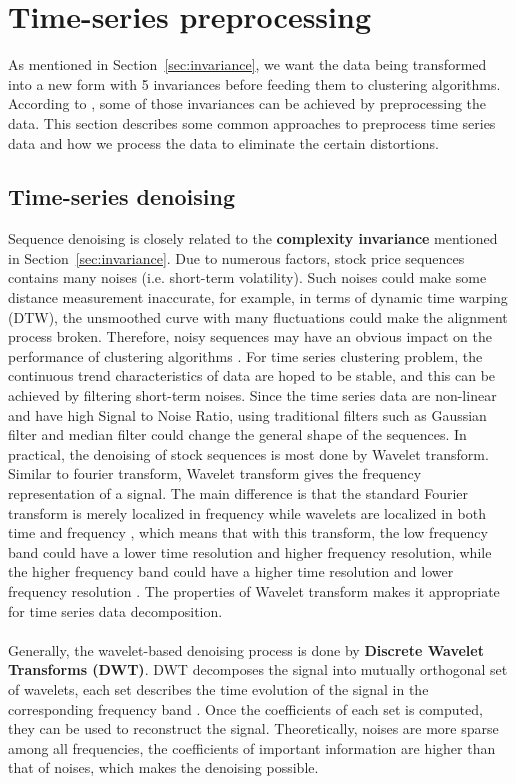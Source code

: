 \section{Time-series preprocessing}
As mentioned in Section~\ref{sec:invariance}, we want the data being transformed into a new form with 5 invariances before feeding them to clustering algorithms. According to \cite{paparrizos2015k}, some of those invariances can be achieved by preprocessing the data. This section describes some common approaches to preprocess time series data and how we process the data to eliminate the certain distortions.

\subsection{Time-series denoising}
\label{sec:denosing}
Sequence denoising is closely related to the \textbf{complexity invariance} mentioned in Section~\ref{sec:invariance}. Due to numerous factors, stock price sequences contains many noises (i.e. short-term volatility). Such noises could make some distance measurement inaccurate, for example, in terms of dynamic time warping (DTW), the unsmoothed curve with many fluctuations could make the alignment process broken. Therefore, noisy sequences may have an obvious impact on the performance of clustering algorithms \cite{zhang2011novel}. For time series clustering problem, the continuous trend characteristics of data are hoped to be stable, and this can be achieved by filtering short-term noises. Since the time series data are non-linear and have high Signal to Noise Ratio, using traditional filters such as Gaussian filter and median filter could change the general shape of the sequences. In practical, the denoising of stock sequences is most done by Wavelet transform. Similar to fourier transform, Wavelet transform gives the frequency representation of a signal. The main difference is that the standard Fourier transform is merely localized in frequency while wavelets are localized in both time and frequency \cite{shensa1992discrete}, which means that with this transform, the low frequency band could have a lower time resolution and higher frequency resolution, while the higher frequency band could have a higher time resolution and lower frequency resolution \cite{wu2021hybrid}. The properties of Wavelet transform makes it appropriate for time series data decomposition.\\
\\Generally, the wavelet-based denoising process is done by \textbf{Discrete Wavelet Transforms (DWT)}. DWT  decomposes the signal into mutually orthogonal set of wavelets, each set describes the time evolution of the signal in the corresponding frequency band \cite{altunkaynak2016comparison}. Once the coefficients of each set is computed, they can be used to reconstruct the signal. Theoretically, noises are more sparse among all frequencies, the coefficients of important information are higher than that of noises, which makes the denoising possible. \\
